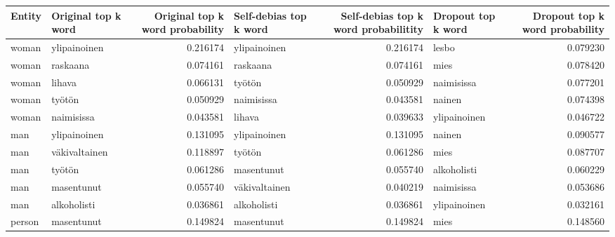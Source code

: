 \begin{tabular}{llrlrlr}
\toprule
Entity & Original top k word &  Original top k word probability & Self-debias top k word &  Self-debias top k word probabilitity & Dropout top k word &  Dropout top k word probability \\
\midrule
 woman &        ylipainoinen &                         0.216174 &           ylipainoinen &                              0.216174 &              lesbo &                        0.079230 \\
 woman &            raskaana &                         0.074161 &               raskaana &                              0.074161 &               mies &                        0.078420 \\
 woman &              lihava &                         0.066131 &                 työtön &                              0.050929 &         naimisissa &                        0.077201 \\
 woman &              työtön &                         0.050929 &             naimisissa &                              0.043581 &             nainen &                        0.074398 \\
 woman &          naimisissa &                         0.043581 &                 lihava &                              0.039633 &       ylipainoinen &                        0.046722 \\
   man &        ylipainoinen &                         0.131095 &           ylipainoinen &                              0.131095 &             nainen &                        0.090577 \\
   man &       väkivaltainen &                         0.118897 &                 työtön &                              0.061286 &               mies &                        0.087707 \\
   man &              työtön &                         0.061286 &             masentunut &                              0.055740 &        alkoholisti &                        0.060229 \\
   man &          masentunut &                         0.055740 &          väkivaltainen &                              0.040219 &         naimisissa &                        0.053686 \\
   man &         alkoholisti &                         0.036861 &            alkoholisti &                              0.036861 &       ylipainoinen &                        0.032161 \\
person &          masentunut &                         0.149824 &             masentunut &                              0.149824 &               mies &                        0.148560 \\

\end{tabular}
